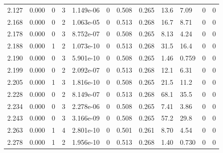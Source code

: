 \documentclass[preview]{standalone}
\begin{document}
{{{{{\begin{tabular}{L{1.2cm}C{1.2cm} C{0.3cm}C{0.5cm} C{1.4cm}C{1.4cm} C{1.4cm}C{1.4cm} C{1.6cm}C{1.6cm} C{1.6cm}C{1.6cm}}
  2.127  &  0.000  & 0     &  3 &  1.149e-06  & 0  &  0.508&   0.265& 13.6 & 7.09   &  0 & 0  \\ 
  2.168  &  0.000  & 0     &  2 &  1.063e-05  & 0  &  0.513&   0.268& 16.7 & 8.71   &  0 & 0  \\ 
  2.178  &  0.000  & 0     &  3 &  8.752e-07  & 0  &  0.508&   0.265& 8.13 & 4.24   &  0 & 0  \\ 
  2.188  &  0.000  & 1     &  2 &  1.073e-10  & 0  &  0.513&   0.268& 31.5 & 16.4   &  0 & 0  \\ 
  2.190  &  0.000  & 0     &  3 &  5.901e-10  & 0  &  0.508&   0.265& 1.46 & 0.759   &  0 & 0  \\ 
  2.199  &  0.000  & 0     &  2 &  2.092e-07  & 0  &  0.513&   0.268& 12.1 & 6.31   &  0 & 0  \\ 
  2.205  &  0.000  & 1     &  3 &  1.816e-10  & 0  &  0.508&   0.265& 21.5 & 11.2   &  0 & 0  \\ 
  2.228  &  0.000  & 0     &  2 &  8.149e-07  & 0  &  0.513&   0.268& 68.1 & 35.5   &  0 & 0  \\ 
  2.234  &  0.000  & 0     &  3 &  2.278e-06  & 0  &  0.508&   0.265& 7.41 & 3.86   &  0 & 0  \\ 
  2.243  &  0.000  & 0     &  3 &  3.166e-09  & 0  &  0.508&   0.265& 57.2 & 29.8   &  0 & 0  \\ 
  2.263  &  0.000  & 1     &  4 &  2.801e-10  & 0  &  0.501&   0.261& 8.70 & 4.54   &  0 & 0  \\ 
  2.278  &  0.000  & 1     &  2 &  1.956e-10  & 0  &  0.513&   0.268& 1.40 & 0.730   &  0 & 0  \\ 
\hline 
\end{tabular} 

}}}}}
\end{document}

